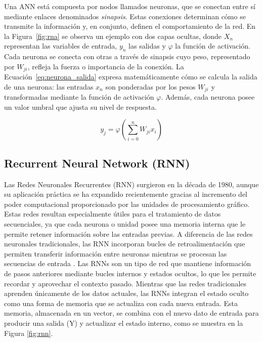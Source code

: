 \justify
Una ANN está compuesta por nodos llamados neuronas, que se conectan entre sí mediante enlaces denominados \textit{sinapsis}. Estas conexiones determinan cómo se transmite la información y, en conjunto, definen el comportamiento de la red. En la Figura~\ref{fig:rna} se observa un ejemplo con dos capas ocultas, donde $X_n$ representan las variables de entrada, $y_n$ las salidas y $\varphi$ la función de activación.
\justify
Cada neurona se conecta con otras a través de sinapsis cuyo peso, representado por $W_{ji}$, refleja la fuerza o importancia de la conexión. La Ecuación~\ref{eq:neurona_salida} expresa matemáticamente cómo se calcula la salida de una neurona: las entradas $x_n$ son ponderadas por los pesos $W_{ji}$ y transformadas mediante la función de activación $\varphi$. Además, cada neurona posee un valor umbral que ajusta su nivel de respuesta.

\begin{equation}
    y_{j} = \varphi \left( \sum_{i=0}^{n} W_{ji}x_{i} \right)
    \label{eq:neurona_salida}
\end{equation}

\subsection{Recurrent Neural Network (RNN)}
\justify
Las Redes Neuronales Recurrentes (RNN) surgieron en la década de 1980, aunque su aplicación práctica se ha expandido recientemente gracias al incremento del poder computacional proporcionado por las unidades de procesamiento gráfico. Estas redes resultan especialmente útiles para el tratamiento de datos secuenciales, ya que cada neurona o unidad posee una memoria interna que le permite retener información sobre las entradas previas. A diferencia de las redes neuronales tradicionales, las RNN incorporan bucles de retroalimentación que permiten transferir información entre neuronas mientras se procesan las secuencias de entrada \cite{lazzeri2020machine}.
\justify
Las RNNs son un tipo de red que mantiene información de pasos anteriores mediante bucles internos y estados ocultos, lo que les permite recordar y aprovechar el contexto pasado. 
Mientras que las redes tradicionales aprenden únicamente de los datos actuales, las RNNs integran el estado oculto como una forma de memoria que se actualiza con cada nueva entrada.
Esta memoria, almacenada en un vector, se combina con el nuevo dato de entrada para producir una salida (Y) y actualizar el estado interno, como se muestra en la Figura \ref{fig:rnn}.

